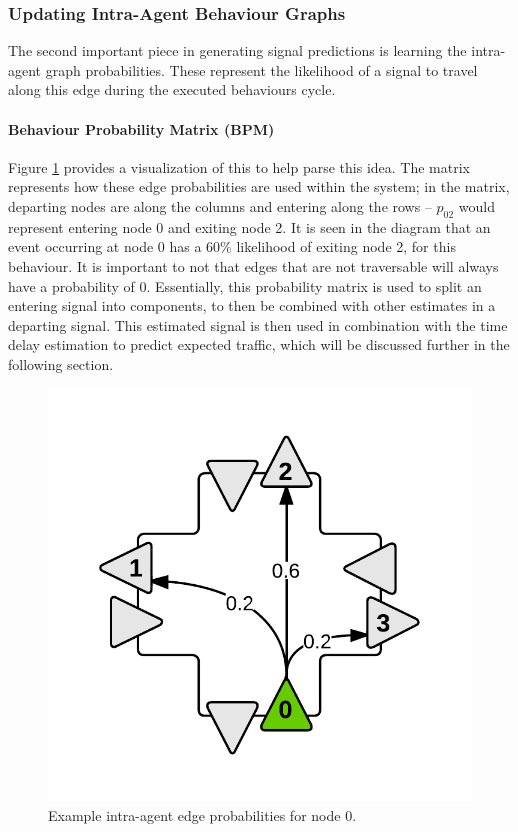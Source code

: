 \documentclass{report}
\begin{document}
\subsubsection{Updating Intra-Agent Behaviour Graphs}

The second important piece in generating signal predictions is learning the intra-agent graph probabilities. 
These represent the likelihood of a signal to travel along this edge during the executed behaviours cycle.

\paragraph{Behaviour Probability Matrix (BPM)}
Figure \ref{fig:BPM-example} provides a visualization of this to help parse this idea. 
The matrix represents how these edge probabilities are used within the system; in the matrix, departing nodes are along the columns and entering along the rows -- $p_{02}$ would represent entering node 0 and exiting node 2. 
It is seen in the diagram that an event occurring at node 0 has a 60\% likelihood of exiting node 2, for this behaviour.
 It is important to not that edges that are not traversable will always have a probability of 0. 
Essentially, this probability matrix is used to split an entering signal into components, to then be combined with other estimates in a departing signal. 
This estimated signal is then used in combination with the time delay estimation to predict expected traffic, which will be discussed further in the following section.

\begin{figure}[H]
  \begin{centering}
    \includegraphics[scale=0.3]{figures/BPM-example.png}
    \caption{Example intra-agent edge probabilities for node 0.}
    \label{fig:BPM-example}
  \end{centering}
\end{figure}
\end{document}
